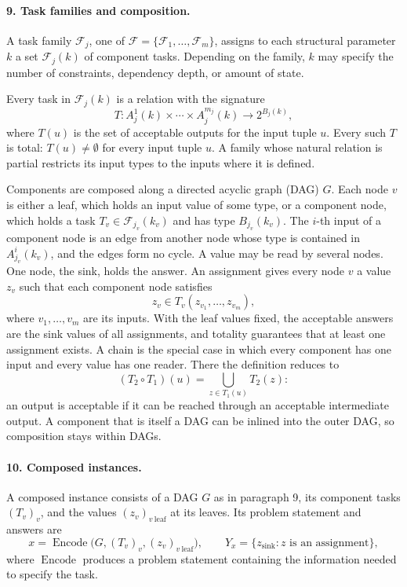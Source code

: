 \documentclass[11pt]{article}
\begin{document}
\paragraph{9. Task families and composition.}
A task family $\mathcal F_j$, one of
$\mathcal F=\{\mathcal F_1,\ldots,\mathcal F_m\}$, assigns to each
structural parameter $k$ a set $\mathcal F_j(k)$ of component tasks.
Depending on the family, $k$ may specify the number of constraints,
dependency depth, or amount of state.

Every task in $\mathcal F_j(k)$ is a relation with the signature
\[
T:A_j^1(k)\times\cdots\times A_j^{m_j}(k)\longrightarrow 2^{B_j(k)},
\]
where $T(u)$ is the set of acceptable outputs for the input tuple $u$.
Every such $T$ is total: $T(u)\neq\emptyset$ for every input tuple $u$. A
family whose natural relation is partial restricts its input types to the
inputs where it is defined.

Components are composed along a directed acyclic graph (DAG) $G$. Each
node $v$ is either a leaf, which holds an input value of some type, or a
component node, which holds a task $T_v\in\mathcal F_{j_v}(k_v)$ and has
type $B_{j_v}(k_v)$. The $i$-th input of a component node is an edge from
another node whose type is contained in $A_{j_v}^i(k_v)$, and the edges
form no cycle. A value may be read by several nodes. One node, the sink,
holds the answer. An assignment gives every node $v$ a value $z_v$ such
that each component node satisfies
\[
z_v\in T_v(z_{v_1},\ldots,z_{v_m}),
\]
where $v_1,\ldots,v_m$ are its inputs. With the leaf values fixed, the
acceptable answers are the sink values of all assignments, and totality
guarantees that at least one assignment exists. A chain is the special
case in which every component has one input and every value has one
reader. There the definition reduces to
\[
(T_2\circ T_1)(u)
=
\bigcup_{z\in T_1(u)}T_2(z):
\]
an output is acceptable if it can be reached through an acceptable
intermediate output. A component that is itself a DAG can be inlined into
the outer DAG, so composition stays within DAGs.

\paragraph{10. Composed instances.}
A composed instance consists of a DAG $G$ as in paragraph 9, its
component tasks $(T_v)_v$, and the values $(z_v)_{v\ \mathrm{leaf}}$ at
its leaves. Its problem statement and answers are
\[
x=\operatorname{Encode}\big(G,(T_v)_v,(z_v)_{v\ \mathrm{leaf}}\big),
\qquad
Y_x=\{z_{\mathrm{sink}}: z\text{ is an assignment}\},
\]
where $\operatorname{Encode}$ produces a problem statement containing the
information needed to specify the task.
\end{document}
